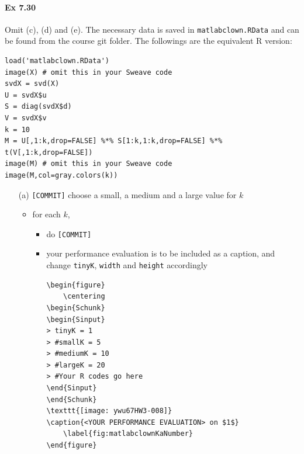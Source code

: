 \documentclass[12pt]{article}
\begin{document}
\paragraph{Ex 7.30}
Omit (c), (d) and (e). 
The necessary data is saved in \verb+matlabclown.RData+ 
and can be found from the course git folder.
The followings are the equivalent R version:
\begin{lstlisting}
load('matlabclown.RData')
image(X) # omit this in your Sweave code
svdX = svd(X)
U = svdX$u
S = diag(svdX$d)
V = svdX$v
k = 10
M = U[,1:k,drop=FALSE] %*% S[1:k,1:k,drop=FALSE] %*% t(V[,1:k,drop=FALSE])
image(M) # omit this in your Sweave code
image(M,col=gray.colors(k))
\end{lstlisting}
\begin{itemize}
    \item[(a)] \verb+[COMMIT]+ choose a small, a medium and a large value for $k$ 
         \begin{itemize}
             \item for each $k$, 
                 \begin{itemize}
             \item do \verb+[COMMIT]+ 
             \item your performance evaluation is to be included as a caption,
            and change \verb+tinyK+, \verb+width+ and \verb+height+ accordingly
\begin{lstlisting}
\begin{figure}
    \centering
\begin{Schunk}
\begin{Sinput}
> tinyK = 1
> #smallK = 5
> #mediumK = 10
> #largeK = 20
> #Your R codes go here
\end{Sinput}
\end{Schunk}
\texttt{[image: ywu67HW3-008]}
\caption{<YOUR PERFORMANCE EVALUATION> on $1$}
    \label{fig:matlabclownKaNumber}
\end{figure}
\end{lstlisting}
                 \end{itemize}
\begin{Schunk}

\end{Schunk}
\end{itemize}
\end{itemize}
\end{document}

